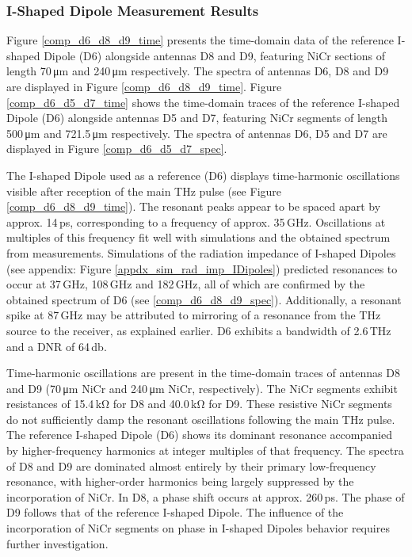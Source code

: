 \subsubsection{I-Shaped Dipole Measurement Results}

Figure \ref{comp_d6_d8_d9_time} presents the time-domain data of the reference I-shaped Dipole (D6) alongside antennas D8 and D9, featuring NiCr sections of length \num{70}\,\si{\micro \meter} and \num{240}\,\si{\micro \meter} respectively. The spectra of antennas D6, D8 and D9 are displayed in Figure \ref{comp_d6_d8_d9_time}. Figure \ref{comp_d6_d5_d7_time} shows the time-domain traces of the reference I-shaped Dipole (D6) alongside antennas D5 and D7, featuring NiCr segments of length \num{500}\,\si{\micro \meter} and \num{721.5}\,\si{\micro \meter} respectively. The spectra of antennas D6, D5 and D7 are displayed in Figure \ref{comp_d6_d5_d7_spec}.

The I-shaped Dipole used as a reference (D6) displays time-harmonic oscillations visible after reception of the main THz pulse (see Figure \ref{comp_d6_d8_d9_time}). The resonant peaks appear to be spaced apart by approx. \num{14}\,\si{\pico \s}, corresponding to a frequency of approx. \num{35}\,\si{\giga \hertz}. Oscillations at multiples of this frequency fit well with simulations and the obtained spectrum from measurements. Simulations of the radiation impedance of I-shaped Dipoles (see appendix: Figure \ref{appdx_sim_rad_imp_IDipoles}) predicted resonances to occur at \num{37}\,\si{\giga \hertz}, \num{108}\,\si{\giga \hertz} and \num{182}\,\si{\giga \hertz}, all of which are confirmed by the obtained spectrum of D6 (see \ref{comp_d6_d8_d9_spec}). Additionally, a resonant spike at \num{87}\,\si{\giga \hertz} may be attributed to mirroring of a resonance from the THz source to the receiver, as explained earlier. D6 exhibits a bandwidth of \num{2.6}\,\si{\tera \hertz} and a DNR of \num{64}\,\si{\decibel}. 

Time-harmonic oscillations are present in the time-domain traces of antennas D8 and D9 (\num{70}\,\si{\micro \meter} NiCr and \num{240}\,\si{\micro \meter} NiCr, respectively). The NiCr segments exhibit resistances of \num{15.4}\,\si{\kilo \ohm} for D8 and \num{40.0}\,\si{\kilo \ohm} for D9. These resistive NiCr segments do not sufficiently damp the resonant oscillations following the main THz pulse. The reference I-shaped Dipole (D6) shows its dominant resonance accompanied by higher-frequency harmonics at integer multiples of that frequency. The spectra of D8 and D9 are dominated almost entirely by their primary low-frequency resonance, with higher-order harmonics being largely suppressed by the incorporation of NiCr. In D8, a phase shift occurs at approx. \num{260}\,\si{\pico \s}. The phase of D9 follows that of the reference I-shaped Dipole. The influence of the incorporation of NiCr segments on phase in I-shaped Dipoles behavior requires further investigation.

